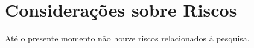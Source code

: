 \chapter{Considerações sobre Riscos}\label{chap:riscos}

Até o presente momento não houve riscos relacionados à pesquisa.
